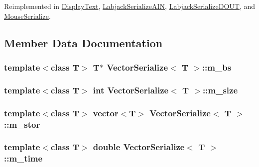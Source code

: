 Reimplemented in \hyperlink{classDisplayText_af663118f6d5010d2d1d45f2bf3680dfc}{Display\-Text}, \hyperlink{classLabjackSerializeAIN_a8ff8a30e23acb11137baab14e47b1d4a}{Labjack\-Serialize\-A\-I\-N}, \hyperlink{classLabjackSerializeDOUT_a814b35d1f45892f684767461d1e8c8a7}{Labjack\-Serialize\-D\-O\-U\-T}, and \hyperlink{classMouseSerialize_a93bdbce909f27855fd2e8eb6edbf75a0}{Mouse\-Serialize}.



\subsection{Member Data Documentation}
\hypertarget{classVectorSerialize_a19b31e3bdca1c74b3255948dc88328a7}{
\subsubsection[{m\-\_\-bs}]{\setlength{\rightskip}{0pt plus 5cm}template$<$class T$>$ T$\ast$ {\bf Vector\-Serialize}$<$ T $>$\-::m\-\_\-bs}}\label{classVectorSerialize_a19b31e3bdca1c74b3255948dc88328a7}
\hypertarget{classVectorSerialize_a27a2e15a8897856a754e6cfeabd79c37}{
\subsubsection[{m\-\_\-size}]{\setlength{\rightskip}{0pt plus 5cm}template$<$class T$>$ int {\bf Vector\-Serialize}$<$ T $>$\-::m\-\_\-size}}\label{classVectorSerialize_a27a2e15a8897856a754e6cfeabd79c37}
\hypertarget{classVectorSerialize_a14f4a4320d206dfe1c631b95eccac441}{
\subsubsection[{m\-\_\-stor}]{\setlength{\rightskip}{0pt plus 5cm}template$<$class T$>$ vector$<$T$>$ {\bf Vector\-Serialize}$<$ T $>$\-::m\-\_\-stor}}\label{classVectorSerialize_a14f4a4320d206dfe1c631b95eccac441}
\hypertarget{classVectorSerialize_ab30720112fe2e2ae893a40f9f06d1fe8}{
\subsubsection[{m\-\_\-time}]{\setlength{\rightskip}{0pt plus 5cm}template$<$class T$>$ double {\bf Vector\-Serialize}$<$ T $>$\-::m\-\_\-time}}\label{classVectorSerialize_ab30720112fe2e2ae893a40f9f06d1fe8}
